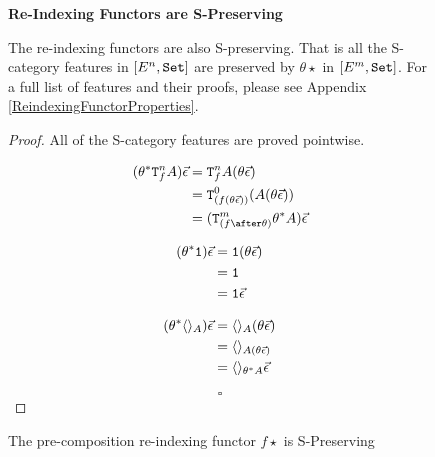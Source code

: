 \documentclass{Report}
\begin{document}
\begin{figure}
    
    \begin{framed}
        \centering
        \textbf{Re-Indexing Functors are S-Preserving}
                
        \begin{theorem}
            The re-indexing functors are also S-preserving. That is all the S-category features in $[E^n, \texttt{Set}]$ are preserved by $\theta\star$ in $[E^m, \texttt{Set}]$. For a full list of features and their proofs, please see Appendix \ref{ReindexingFunctorProperties}.
        \end{theorem}
        
        
        \begin{proof}
            All of the S-category features are proved pointwise.
        
            \begin{align*}
                (\theta\star\Tn{f}{A})\ev & = \Tn{f}{A}(\theta\ev) \\
                & = \Tz{(f(\theta\ev))}{(A(\theta\ev))}\\
                & = (\Tm{(f\after\theta)}{\theta\star A})\ev\\
            \end{align*}
        
            
        \begin{align*}
            (\theta^* \texttt{1})\vec{\epsilon} & = \texttt{1}(\theta\vec{\epsilon})\\
            & = \texttt{1} \\
            & = \texttt{1} \vec{\epsilon}\\
        \end{align*}
        
        \begin{align*}
            (\theta^*\langle\rangle_{A})\vec{\epsilon} & = \langle\rangle_{A}(\theta\vec{\epsilon})\\
            & = \langle\rangle_{A(\theta\vec{\epsilon})}\\
            & = \langle\rangle_{\theta^* A}\vec{\epsilon}
        \end{align*}
        
            $$\square$$
        \end{proof}
    \end{framed}
    \caption{The pre-composition re-indexing functor $f\star$ is S-Preserving}
    \label{PrecompositionSClosure}
\end{figure}
\end{document}
